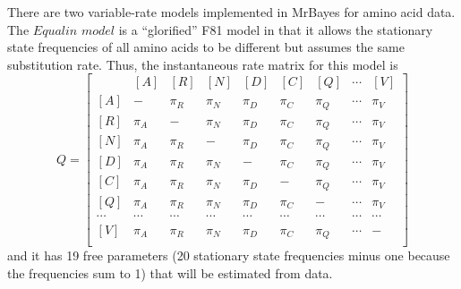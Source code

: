 \documentclass[12pt]{book}
\begin{document}
There are two variable-rate models implemented in MrBayes for amino acid data. The $Equalin$
$model$ is a ``glorified'' F81 model in that it allows the stationary state frequencies of all
amino acids to be different but assumes the same substitution rate. Thus, the instantaneous rate
matrix for this model is
\footnotesize
\[
Q=\begin{bmatrix}
    & [A] & [R] & [N] & [D] & [C] & [Q] & \cdots & [V]\\
 [A]& - & \pi_{R} & \pi_{N} & \pi_{D}& \pi_{C}& \pi_{Q} & \cdots & \pi_V\\
 [R]& \pi_{A} &- &  \pi_{N} & \pi_{D}& \pi_{C}& \pi_{Q} & \cdots & \pi_V\\
 [N]& \pi_{A} &\pi_{R} &- &   \pi_{D}& \pi_{C}& \pi_{Q} & \cdots & \pi_V\\
 [D]& \pi_{A} &\pi_{R} &  \pi_{N}&- &  \pi_{C}& \pi_{Q} & \cdots & \pi_V\\
 [C]& \pi_{A} &\pi_{R} &  \pi_{N}&  \pi_{D}&- & \pi_{Q} & \cdots & \pi_V\\
 [Q]& \pi_{A} &\pi_{R} &  \pi_{N}&  \pi_{D}& \pi_{C} &- & \cdots & \pi_V\\
 \cdots& \cdots& \cdots& \cdots& \cdots& \cdots& \cdots& \cdots& \cdots\\
 [V]& \pi_{A} &\pi_{R} &  \pi_{N}&  \pi_{D}& \pi_{C} &\pi_Q & \cdots &- \\
\end{bmatrix}
\]
\normalsize
and it has 19 free parameters (20 stationary state frequencies minus one because the frequencies
sum to 1) that will be estimated from data.
\end{document}
